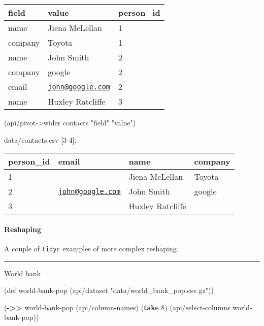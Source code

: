 \documentclass[]{article}
\newenvironment{Shaded}{\begin{snugshade}}{\end{snugshade}}
\newcommand{\KeywordTok}[1]{\textcolor[rgb]{0.13,0.29,0.53}{\textbf{#1}}}
\newcommand{\DecValTok}[1]{\textcolor[rgb]{0.00,0.00,0.81}{#1}}
\newcommand{\StringTok}[1]{\textcolor[rgb]{0.31,0.60,0.02}{#1}}
\newcommand{\FunctionTok}[1]{\textcolor[rgb]{0.00,0.00,0.00}{#1}}
\newcommand{\BuiltInTok}[1]{#1}
\newcommand{\NormalTok}[1]{#1}
\let\oldparagraph\paragraph
\renewcommand{\paragraph}[1]{\oldparagraph{#1}\mbox{}}
\begin{document}
\begin{longtable}[]{@{}lll@{}}
\toprule
field & value & person\_id\tabularnewline
\midrule
\endhead
name & Jiena McLellan & 1\tabularnewline
company & Toyota & 1\tabularnewline
name & John Smith & 2\tabularnewline
company & google & 2\tabularnewline
email & \href{mailto:john@google.com}{\nolinkurl{john@google.com}} &
2\tabularnewline
name & Huxley Ratcliffe & 3\tabularnewline
\bottomrule
\end{longtable}

\begin{Shaded}
\begin{Highlighting}[]
\NormalTok{(api/pivot->wider contacts }\StringTok{"field"} \StringTok{"value"}\NormalTok{)}
\end{Highlighting}
\end{Shaded}

data/contacts.csv {[}3 4{]}:

\begin{longtable}[]{@{}llll@{}}
\toprule
person\_id & email & name & company\tabularnewline
\midrule
\endhead
1 & & Jiena McLellan & Toyota\tabularnewline
2 & \href{mailto:john@google.com}{\nolinkurl{john@google.com}} & John
Smith & google\tabularnewline
3 & & Huxley Ratcliffe &\tabularnewline
\bottomrule
\end{longtable}

\paragraph{Reshaping}\label{reshaping}

A couple of \texttt{tidyr} examples of more complex reshaping.

\begin{center}\rule{0.5\linewidth}{0.5pt}\end{center}

\href{https://tidyr.tidyverse.org/articles/pivot.html\#world-bank}{World
bank}

\begin{Shaded}
\begin{Highlighting}[]
\NormalTok{(}\BuiltInTok{def}\FunctionTok{ world-bank-pop }\NormalTok{(api/dataset }\StringTok{"data/world_bank_pop.csv.gz"}\NormalTok{))}
\end{Highlighting}
\end{Shaded}

\begin{Shaded}
\begin{Highlighting}[]
\NormalTok{(}\KeywordTok{->>}\NormalTok{ world-bank-pop}
\NormalTok{     (api/column-names)}
\NormalTok{     (}\KeywordTok{take} \DecValTok{8}\NormalTok{)}
\NormalTok{     (api/select-columns world-bank-pop))}
\end{Highlighting}
\end{Shaded}
\end{document}
